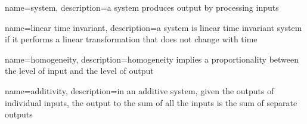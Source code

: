 {
  name=system,
  description={a system produces output by processing inputs}
}

{
  name=linear time invariant,
  description={a system is linear time invariant system if it performs a linear
  transformation that does not change with time}
}

{
  name=homogeneity,
  description={homogeneity implies a proportionality between the level of
  input and the level of output}
}

{
  name=additivity,
  description={in an additive system, given the outputs of individual inputs,
  the output to the sum of all the inputs is the sum of separate outputs}
}
